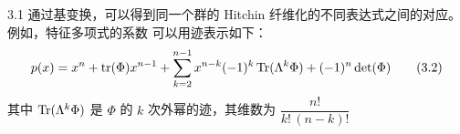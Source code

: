 \begin{rem}{3.1}
通过基变换，可以得到同一个群的 Hitchin 纤维化的不同表达式之间的对应。例如，特征多项式的系数
可以用迹表示如下：
\begin{equation}
p(x)=x^n+\operatorname{tr}(\Phi)x^{n-1}+\sum_{k=2}^{n-1}x^{n-k}(-1)^k\operatorname{Tr}(\Lambda^k\Phi)+(-1)^n\det(\Phi) \tag{3.2}
\end{equation}
其中 $\operatorname{Tr}(\Lambda^k\Phi)$ 是 $\Phi$ 的 $k$ 次外幂的迹，其维数为 $\dfrac{n!}{k!\,(n-k)!}$
\end{rem}
